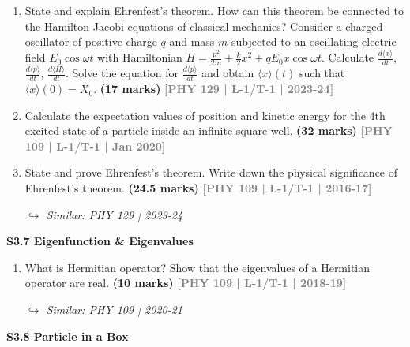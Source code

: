 \documentclass[12pt,a3paper]{article}
\newcommand{\yr}[1]{\hfill\textcolor{gray}{\small\textbf{[#1]}}}
\newcommand{\mk}[1]{\textcolor{orange!70!black}{\small\textbf{(#1 marks)}}}
\newcommand{\variant}[1]{\par\vspace{1pt}\textcolor{blue!50!black}%
  {\footnotesize\textit{$\hookrightarrow$ Similar: #1}}}
\newcommand{\subtopic}[2]{%
  \vspace{10pt}
  \noindent\begin{tcolorbox}[colback=#1!8,colframe=#1,boxrule=0.6pt,arc=4pt,
    left=6pt,right=6pt,top=4pt,bottom=4pt]
    \small\bfseries\textcolor{#1}{#2}
  \end{tcolorbox}
  \vspace{2pt}
}
\begin{document}
\begin{enumerate}

\item State and explain Ehrenfest's theorem. How can this theorem be connected to the Hamilton-Jacobi equations of classical mechanics? Consider a charged oscillator of positive charge $q$ and mass $m$ subjected to an oscillating electric field $E_0\cos\omega t$ with Hamiltonian $H = \frac{p^2}{2m} + \frac{k}{2}x^2 + qE_0 x\cos\omega t$. Calculate $\frac{d\langle x\rangle}{dt}$, $\frac{d\langle p\rangle}{dt}$, $\frac{d\langle H\rangle}{dt}$. Solve the equation for $\frac{d\langle p\rangle}{dt}$ and obtain $\langle x\rangle(t)$ such that $\langle x\rangle(0) = X_0$.
\mk{17} \yr{PHY 129 | L-1/T-1 | 2023-24}

\item Calculate the expectation values of position and kinetic energy for the 4th excited state of a particle inside an infinite square well.
\mk{32} \yr{PHY 109 | L-1/T-1 | Jan 2020}

\item State and prove Ehrenfest's theorem. Write down the physical significance of Ehrenfest's theorem.
\mk{24.5} \yr{PHY 109 | L-1/T-1 | 2016-17}
\variant{PHY 129 | 2023-24}

\end{enumerate}

\label{sec:s37}
\subtopic{cA}{S3.7 \quad Eigenfunction \& Eigenvalues}

\begin{enumerate}

\item What is Hermitian operator? Show that the eigenvalues of a Hermitian operator are real.
\mk{10} \yr{PHY 109 | L-1/T-1 | 2018-19}
\variant{PHY 109 | 2020-21}

\end{enumerate}

\label{sec:s38}
\subtopic{cA}{S3.8 \quad Particle in a Box}
\end{document}
